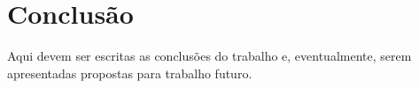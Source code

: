 
\chapter{Conclusão}
\label{conclusao}

Aqui devem ser escritas as conclusões do trabalho e, eventualmente, serem apresentadas propostas para trabalho futuro.





